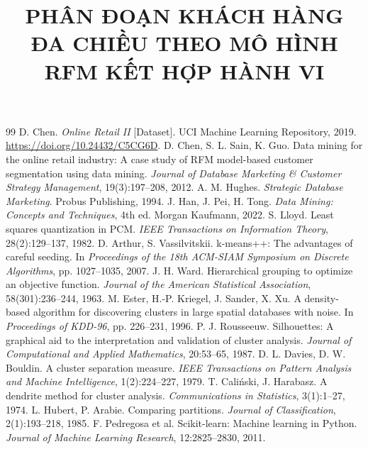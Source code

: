 \documentclass{hcmut-report}
\title{PHÂN ĐOẠN KHÁCH HÀNG ĐA CHIỀU THEO MÔ HÌNH RFM KẾT HỢP HÀNH VI}
\begin{document}
\coverpage%
\begingroup
{}
\tableofcontents
\endgroup
\clearpage









\clearpage
{}
{}
\renewcommand{\refname}{TÀI LIỆU THAM KHẢO}
\begin{thebibliography}{99}
 D. Chen. \emph{Online Retail II} [Dataset]. UCI Machine Learning Repository, 2019. \url{https://doi.org/10.24432/C5CG6D}.
 D. Chen, S. L. Sain, K. Guo. Data mining for the online retail industry: A case study of RFM model-based customer segmentation using data mining. \emph{Journal of Database Marketing \& Customer Strategy Management}, 19(3):197--208, 2012.
 A. M. Hughes. \emph{Strategic Database Marketing}. Probus Publishing, 1994.
 J. Han, J. Pei, H. Tong. \emph{Data Mining: Concepts and Techniques}, 4th ed. Morgan Kaufmann, 2022.
 S. Lloyd. Least squares quantization in PCM. \emph{IEEE Transactions on Information Theory}, 28(2):129--137, 1982.
 D. Arthur, S. Vassilvitskii. k-means++: The advantages of careful seeding. In \emph{Proceedings of the 18th ACM-SIAM Symposium on Discrete Algorithms}, pp. 1027--1035, 2007.
 J. H. Ward. Hierarchical grouping to optimize an objective function. \emph{Journal of the American Statistical Association}, 58(301):236--244, 1963.
 M. Ester, H.-P. Kriegel, J. Sander, X. Xu. A density-based algorithm for discovering clusters in large spatial databases with noise. In \emph{Proceedings of KDD-96}, pp. 226--231, 1996.
 P. J. Rousseeuw. Silhouettes: A graphical aid to the interpretation and validation of cluster analysis. \emph{Journal of Computational and Applied Mathematics}, 20:53--65, 1987.
 D. L. Davies, D. W. Bouldin. A cluster separation measure. \emph{IEEE Transactions on Pattern Analysis and Machine Intelligence}, 1(2):224--227, 1979.
 T. Cali\'{n}ski, J. Harabasz. A dendrite method for cluster analysis. \emph{Communications in Statistics}, 3(1):1--27, 1974.
 L. Hubert, P. Arabie. Comparing partitions. \emph{Journal of Classification}, 2(1):193--218, 1985.
 F. Pedregosa et al. Scikit-learn: Machine learning in Python. \emph{Journal of Machine Learning Research}, 12:2825--2830, 2011.
\end{thebibliography}
\end{document}
